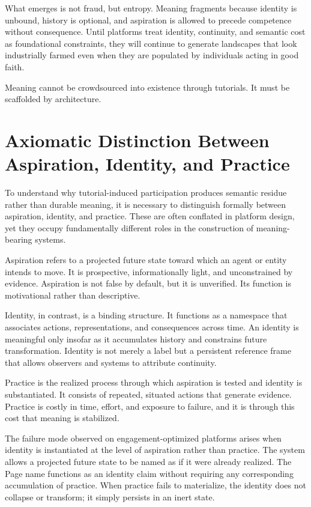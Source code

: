 \documentclass[11pt,oneside]{article}
\begin{document}
What emerges is not fraud, but entropy. Meaning fragments because identity is unbound, history is optional, and aspiration is allowed to precede competence without consequence. Until platforms treat identity, continuity, and semantic cost as foundational constraints, they will continue to generate landscapes that look industrially farmed even when they are populated by individuals acting in good faith.

Meaning cannot be crowdsourced into existence through tutorials. It must be scaffolded by architecture.

\section{Axiomatic Distinction Between Aspiration, Identity, and Practice}

To understand why tutorial-induced participation produces semantic residue rather than durable meaning, it is necessary to distinguish formally between aspiration, identity, and practice. These are often conflated in platform design, yet they occupy fundamentally different roles in the construction of meaning-bearing systems.

Aspiration refers to a projected future state toward which an agent or entity intends to move. It is prospective, informationally light, and unconstrained by evidence. Aspiration is not false by default, but it is unverified. Its function is motivational rather than descriptive.

Identity, in contrast, is a binding structure. It functions as a namespace that associates actions, representations, and consequences across time. An identity is meaningful only insofar as it accumulates history and constrains future transformation. Identity is not merely a label but a persistent reference frame that allows observers and systems to attribute continuity.

Practice is the realized process through which aspiration is tested and identity is substantiated. It consists of repeated, situated actions that generate evidence. Practice is costly in time, effort, and exposure to failure, and it is through this cost that meaning is stabilized.

The failure mode observed on engagement-optimized platforms arises when identity is instantiated at the level of aspiration rather than practice. The system allows a projected future state to be named as if it were already realized. The Page name functions as an identity claim without requiring any corresponding accumulation of practice. When practice fails to materialize, the identity does not collapse or transform; it simply persists in an inert state.
\end{document}
